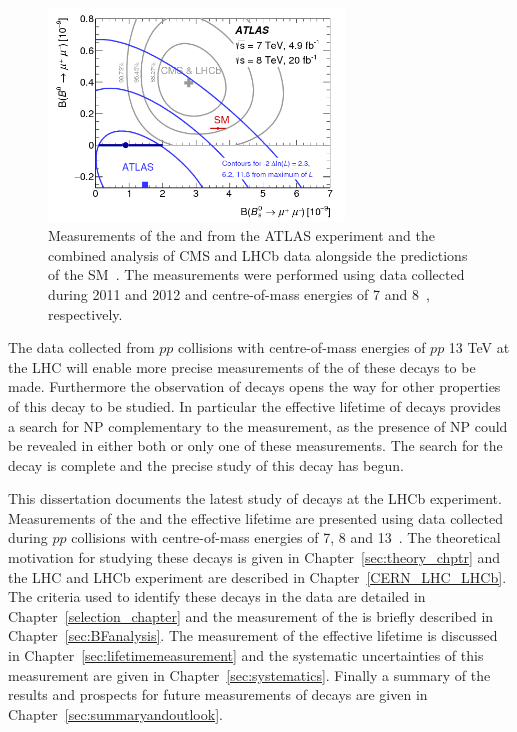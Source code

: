 \begin{figure}[tbp]
    \centering
        \includegraphics[width=0.7\textwidth]{./Figs/Introduction/contour_plot.png}
        \caption{Measurements of the \bdmumu \BF and \bsmumu \BF from the ATLAS experiment and the combined analysis of CMS and LHCb data alongside the predictions of the SM~\cite{Aaboud:2016ire}. The measurements were performed using data collected during 2011 and 2012 and centre-of-mass energies of 7 and 8~\tev, respectively.}
        \label{fig:contour}
\end{figure}

The data collected from $pp$ collisions with centre-of-mass energies of $pp$ 13 TeV at the LHC will enable more precise measurements of the \BFs of these decays to be made. 
Furthermore the observation of \bsmumu decays opens the way for other properties of this decay to be studied. In particular the effective lifetime of \bsmumu decays provides a search for NP complementary to the \BF measurement, as the presence of NP could be revealed in either both or only one of these measurements. The search for the \bsmumu decay is complete and the precise study of this decay has begun.



This dissertation documents the latest study of \bmumu decays at the LHCb experiment. Measurements of the \bmumu \BF and the \bsmumu effective lifetime are presented using data collected during $pp$ collisions with centre-of-mass energies of 7, 8 and 13~\tev. The theoretical motivation for studying these decays is given in Chapter~\ref{sec:theory_chptr} and the LHC and LHCb experiment are described in Chapter~\ref{CERN_LHC_LHCb}. The criteria used to identify these decays in the data are detailed in Chapter~\ref{selection_chapter} and the measurement of the \BF is briefly described in Chapter~\ref{sec:BFanalysis}. The measurement of the \bsmumu effective lifetime is discussed in Chapter~\ref{sec:lifetimemeasurement} and the systematic uncertainties of this measurement are given in Chapter~\ref{sec:systematics}. Finally a summary of the results and prospects for future measurements of \bmumu decays are given in Chapter~\ref{sec:summaryandoutlook}.

